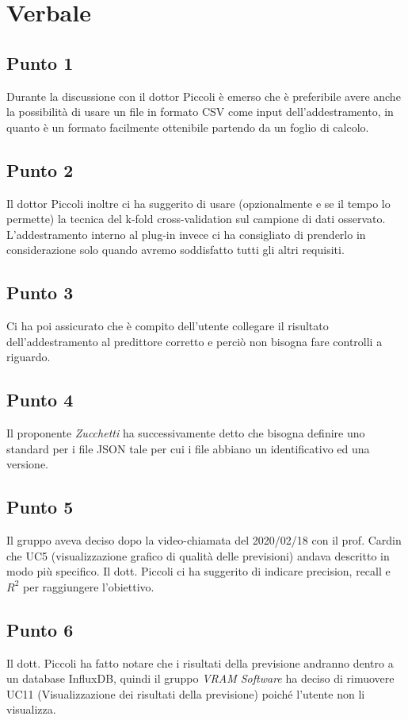 \section{Verbale}
        \subsection{Punto 1}
            Durante la discussione con il dottor Piccoli è emerso che è preferibile avere anche la possibilità di usare un file in formato CSV come input dell'addestramento, in quanto è un formato facilmente ottenibile partendo da un foglio di calcolo.
        \subsection{Punto 2}
            Il dottor Piccoli inoltre ci ha suggerito di usare (opzionalmente e se il tempo lo permette) la tecnica del k-fold cross-validation sul campione di dati osservato. L'addestramento interno al plug-in invece ci ha consigliato di prenderlo in considerazione solo quando avremo soddisfatto tutti gli altri requisiti.
        \subsection{Punto 3}
            Ci ha poi assicurato che è compito dell'utente collegare il risultato dell'addestramento al predittore corretto e perciò non bisogna fare controlli a riguardo.
        \subsection{Punto 4}
            Il proponente \textit{Zucchetti} ha successivamente detto che bisogna definire uno standard per i file JSON tale per cui i file abbiano un identificativo ed una versione.
        \subsection{Punto 5}
        	Il gruppo aveva deciso dopo la video-chiamata del 2020/02/18 con il prof. Cardin che UC5 (visualizzazione grafico di qualità delle previsioni) andava descritto in modo più specifico. Il dott. Piccoli ci ha suggerito di indicare precision, recall e $R^{2}$ per raggiungere l'obiettivo.
        \subsection{Punto 6}
        	Il dott. Piccoli ha fatto notare che i risultati della previsione andranno dentro a un database InfluxDB, quindi il gruppo \textit{VRAM Software} ha deciso di rimuovere UC11 (Visualizzazione dei risultati della previsione) poiché l'utente non li visualizza.